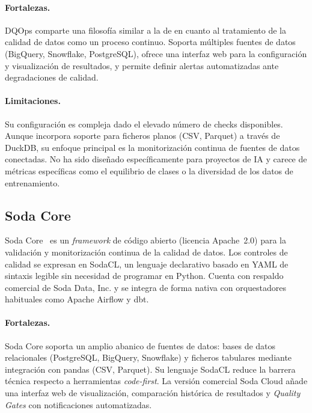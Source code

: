 \paragraph{Fortalezas.}
DQOps comparte una filosofía similar a la de \dataqual en cuanto al
tratamiento de la calidad de datos como un proceso continuo. Soporta múltiples
fuentes de datos (BigQuery, Snowflake, PostgreSQL), ofrece una interfaz web
para la configuración y visualización de resultados, y permite definir alertas
automatizadas ante degradaciones de calidad.

\paragraph{Limitaciones.}
Su configuración es compleja dado el elevado número de checks disponibles.
Aunque incorpora soporte para ficheros planos (\ac{CSV}, Parquet) a través
de DuckDB, su enfoque principal es la monitorización continua de fuentes de
datos conectadas. No ha sido diseñado específicamente para proyectos de
\ac{IA} y carece de métricas específicas como el equilibrio de clases o
la diversidad de los datos de entrenamiento.

\subsection{Soda Core}
\label{sec:soda-core}

Soda Core~\citep{sodacore} es un \emph{framework} de código abierto (licencia
Apache~2.0) para la validación y monitorización continua de la calidad de datos.
Los controles de calidad se expresan en \ac{SodaCL}, un lenguaje declarativo
basado en \ac{YAML} de sintaxis legible sin necesidad de programar en Python.
Cuenta con respaldo comercial de Soda Data, Inc. y se integra de forma nativa
con orquestadores habituales como Apache Airflow y dbt.

\paragraph{Fortalezas.}
Soda Core soporta un amplio abanico de fuentes de datos: bases de datos
relacionales (PostgreSQL, BigQuery, Snowflake) y ficheros tabulares mediante
integración con pandas (\ac{CSV}, Parquet).  Su lenguaje \ac{SodaCL} reduce la
barrera técnica respecto a herramientas \emph{code-first}.  La versión comercial
Soda Cloud añade una interfaz web de visualización, comparación histórica de
resultados y \emph{Quality Gates} con notificaciones automatizadas.

